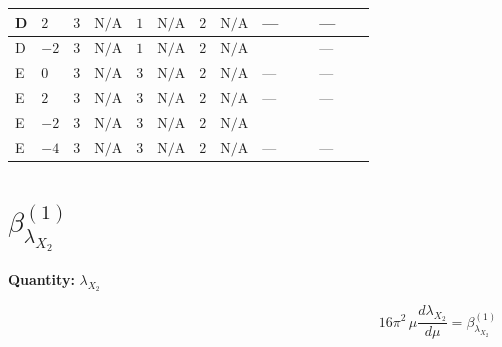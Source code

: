 \documentclass[8pt]{article}
\begin{document}
\begin{landscape}
\begin{longtable}{@{}llcccccc >{\raggedright\arraybackslash}p{0.21\linewidth} >{\raggedright\arraybackslash}p{0.21\linewidth}@{}}
\midrule
D & $2$ & $3$ & $\text{N/A}$ & $1$ & $\text{N/A}$ & $2$ & $\text{N/A}$ & --- & --- \\
\midrule
D & $-2$ & $3$ & $\text{N/A}$ & $1$ & $\text{N/A}$ & $2$ & $\text{N/A}$ & \scriptsize\adjustbox{max width=\linewidth}{$\begin{gathered} +3 {\lambda_{X_{7}}^{(1)}}^2\end{gathered}$} & --- \\
\midrule
E & $0$ & $3$ & $\text{N/A}$ & $3$ & $\text{N/A}$ & $2$ & $\text{N/A}$ & --- & --- \\
\midrule
E & $2$ & $3$ & $\text{N/A}$ & $3$ & $\text{N/A}$ & $2$ & $\text{N/A}$ & --- & --- \\
\midrule
E & $-2$ & $3$ & $\text{N/A}$ & $3$ & $\text{N/A}$ & $2$ & $\text{N/A}$ & \scriptsize\adjustbox{max width=\linewidth}{$\begin{gathered} +3 {\lambda_{X_{7}}^{(1)}}^2\end{gathered}$} & \scriptsize\adjustbox{max width=\linewidth}{$\begin{gathered} +2 {\lambda_{X_{7}}^{(1)}} {\lambda_{X_{7}}^{(2)}}\end{gathered}$} \\
\midrule
E & $-4$ & $3$ & $\text{N/A}$ & $3$ & $\text{N/A}$ & $2$ & $\text{N/A}$ & --- & --- \\
\midrule
\bottomrule
\end{longtable}
\clearpage
\section*{$\beta_{{\lambda_{X_{2}}}}^{(1)}$}
\noindent\textbf{Quantity: }${\lambda_{X_{2}}}$\par\smallskip
\[16\pi^2\,\mu\frac{d {\lambda_{X_{2}}}}{d\mu}=\beta_{{\lambda_{X_{2}}}}^{(1)}\]

\end{landscape}
\end{document}
